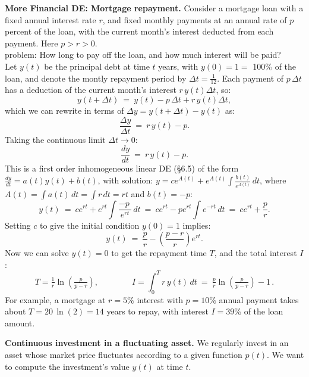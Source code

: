 \documentclass[11pt]{article}
\begin{document}
\newpage

\footnotesize

\noindent
{\bf More Financial DE: Mortgage repayment.} 
Consider a mortgage loan with a fixed annual interest rate $r$, 
and fixed monthly payments at an annual rate of $p$ percent of the loan,
with the current month's interest deducted from each payment. Here $p>r>0$.
\\[.5em]
{\sc problem:} How long to pay off the loan, and how much interest will be paid?
\\[.5em]
Let $y(t)$ be the principal debt at time $t$ years, with $y(0)=1=$ 100\% of the loan,
and denote the montly repayment period by $\Delta t = \frac{1}{12}$. 
Each payment of $p\,\Delta t$ has a deduction 
of the current month's interest $r\,y(t)\Delta t$, so:
$$
y(t{+}\Delta t) \ =\ y(t) - p\,\Delta t + r\,y(t)\Delta t,
$$
which we can rewrite in terms of $\Delta y = y(t{+}\Delta t)- y(t)$ as:
$$
\frac{\Delta y}{\Delta t} \ =\  r\,y(t)- p.
$$
Taking the continuous limit $\Delta t\to 0$:
$$
\frac{dy}{dt} \ =\  r\,y(t)- p.
$$
This is a first order inhomogeneous linear DE (\S6.5) of the form $\frac{dy}{dt} = a(t)y(t)+ b(t)$, 
with solution: 
$y = ce^{A(t)} + e^{A(t)}\!\int\! \frac{b(t)}{e^{A(t)}}\,dt$, 
where $A(t) = \int\! a(t)\,dt = \int r \,dt = rt$ and $b(t) = -p$:
$$
y(t) \ =\  ce^{rt}+ e^{rt}\!\int\! \frac{-p\ }{e^{rt}}\,dt
\ =\  ce^{rt}-p e^{rt}\!\int\! e^{-rt}\,dt
\ =\  ce^{rt} +\frac pr.
$$
Setting $c$ to give the initial condition $y(0)=1$ implies:
$$
y(t) \ =\ \frac pr -\left(\!\frac{p{-}r}{r}\!\right) e^{rt} .
$$
Now we can solve $y(t)=0$ to get the repayment time $T$, and the total interest $I$:
$$
T = \tfrac 1r\ln(\tfrac{p}{p-r}), \qquad\qquad
I = \int_0^T\! r\,y(t)\,dt \ =\ \tfrac pr \ln(\tfrac{p}{p-r}) - 1 \,.
$$
For example, a mortgage at $r = 5\%$ interest with $p=10\%$ annual payment 
takes about $T=20\,\ln(2)= 14$ years to repay, with interest $I =39\%$
of the loan amount.

\medskip


\noindent
{\bf Continuous investment in a fluctuating asset.} 
We regularly invest in an asset whose market price fluctuates according to 
a given function $p(t)$. We want to compute the investment's value $y(t)$ at time $t$.
\end{document}
